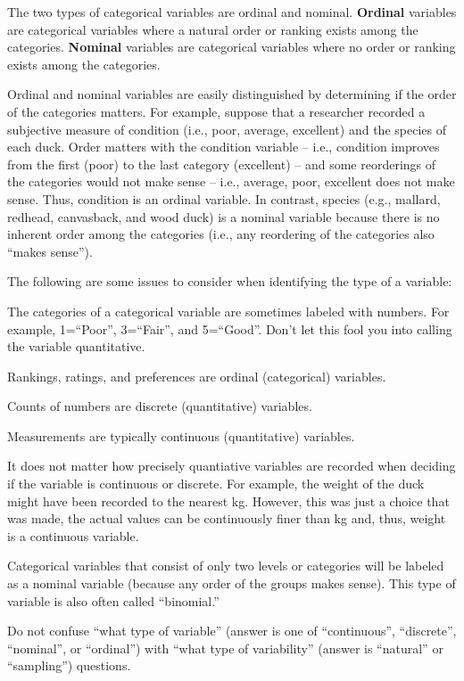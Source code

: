 \documentclass[10pt,openany]{book}\usepackage[]{graphicx}\usepackage[]{color}
\begin{document}
The two types of categorical variables are ordinal and nominal. \textbf{Ordinal} variables are categorical variables where a natural order or ranking exists among the categories.  \textbf{Nominal} variables are categorical variables where no order or ranking exists among the categories.

Ordinal and nominal variables are easily distinguished by determining if the order of the categories matters. For example, suppose that a researcher recorded a subjective measure of condition (i.e., poor, average, excellent) and the species of each duck. Order matters with the condition variable -- i.e., condition improves from the first (poor) to the last category (excellent) -- and some reorderings of the categories would not make sense -- i.e., average, poor, excellent does not make sense. Thus, condition is an ordinal variable. In contrast, species (e.g., mallard, redhead, canvasback, and wood duck) is a nominal variable because there is no inherent order among the categories (i.e., any reordering of the categories also ``makes sense'').


The following are some issues to consider when identifying the type of a variable:
\begin{Enumerate}
  \item The categories of a categorical variable are sometimes labeled with numbers. For example, 1=``Poor'', 3=``Fair'', and 5=``Good''. Don't let this fool you into calling the variable quantitative.
  \item Rankings, ratings, and preferences are ordinal (categorical) variables.
  \item Counts of numbers are discrete (quantitative) variables.
  \item Measurements are typically continuous (quantitative) variables.
  \item It does not matter how precisely quantiative variables are recorded when deciding if the variable is continuous or discrete. For example, the weight of the duck might have been recorded to the nearest kg. However, this was just a choice that was made, the actual values can be continuously finer than kg and, thus, weight is a continuous variable.
  \item Categorical variables that consist of only two levels or categories will be labeled as a nominal variable (because any order of the groups makes sense). This type of variable is also often called ``binomial.''
  \item Do not confuse ``what type of variable'' (answer is one of ``continuous'', ``discrete'', ``nominal'', or ``ordinal'')  with ``what type of variability'' (answer is ``natural'' or ``sampling'') questions.
\end{Enumerate}
\end{document}
